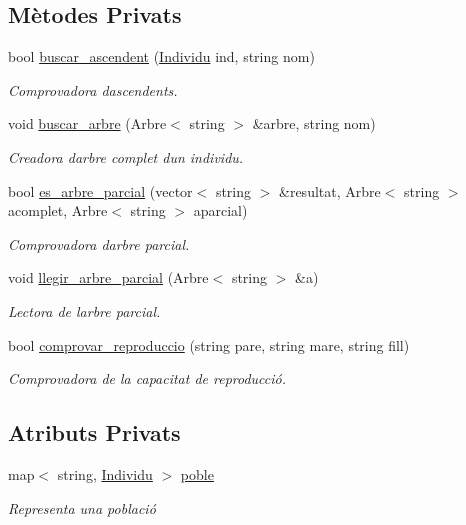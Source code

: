 \subsection*{Mètodes Privats}
\begin{DoxyCompactItemize}
\item 
bool \hyperlink{class_poblacio_aec49e868f8a0373f575ff86579e4f9ad}{buscar\+\_\+ascendent} (\hyperlink{class_individu}{Individu} ind, string nom)
\begin{DoxyCompactList}\small\item\em Comprovadora d\textquotesingle{}ascendents. \end{DoxyCompactList}\item 
void \hyperlink{class_poblacio_ad35ab2cc93d5d79061e4bb4829ace045}{buscar\+\_\+arbre} (Arbre$<$ string $>$ \&arbre, string nom)
\begin{DoxyCompactList}\small\item\em Creadora d\textquotesingle{}arbre complet d\textquotesingle{}un individu. \end{DoxyCompactList}\item 
bool \hyperlink{class_poblacio_a41f8178d145d0f41094b49256751d8c2}{es\+\_\+arbre\+\_\+parcial} (vector$<$ string $>$ \&resultat, Arbre$<$ string $>$ acomplet, Arbre$<$ string $>$ aparcial)
\begin{DoxyCompactList}\small\item\em Comprovadora d\textquotesingle{}arbre parcial. \end{DoxyCompactList}\item 
void \hyperlink{class_poblacio_a0b60d947870b310929e4fc451b13ec01}{llegir\+\_\+arbre\+\_\+parcial} (Arbre$<$ string $>$ \&a)
\begin{DoxyCompactList}\small\item\em Lectora de l\textquotesingle{}arbre parcial. \end{DoxyCompactList}\item 
bool \hyperlink{class_poblacio_a1f54c4af151e3e8433f36342db0f984d}{comprovar\+\_\+reproduccio} (string pare, string mare, string fill)
\begin{DoxyCompactList}\small\item\em Comprovadora de la capacitat de reproducció. \end{DoxyCompactList}\end{DoxyCompactItemize}
\subsection*{Atributs Privats}
\begin{DoxyCompactItemize}
\item 
map$<$ string, \hyperlink{class_individu}{Individu} $>$ \hyperlink{class_poblacio_adc5549ea0f51e16440bc4cf0928b0d50}{poble}
\begin{DoxyCompactList}\small\item\em Representa una població \end{DoxyCompactList}\end{DoxyCompactItemize}


